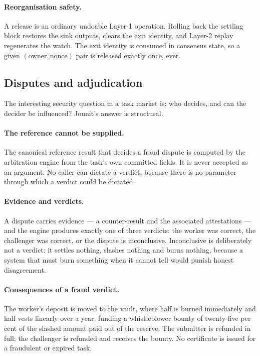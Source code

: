 \documentclass{article}
\begin{document}
\paragraph{Reorganisation safety.} A release is an ordinary undoable Layer-1
operation. Rolling back the settling block restores the sink outputs, clears
the exit identity, and Layer-2 replay regenerates the watch. The exit identity
is consumed in consensus state, so a given $(\text{owner}, \text{nonce})$ pair
is released exactly once, ever.

\subsection{Disputes and adjudication}
\label{sec:disputes}

The interesting security question in a task market is: who decides, and can the
decider be influenced? Jounit's answer is structural.

\paragraph{The reference cannot be supplied.} The canonical reference result
that decides a fraud dispute is computed by the arbitration engine from the
task's own committed fields. It is never accepted as an argument. No caller can
dictate a verdict, because there is no parameter through which a verdict could
be dictated.

\paragraph{Evidence and verdicts.} A dispute carries evidence --- a
counter-result and the associated attestations --- and the engine produces
exactly one of three verdicts: the worker was correct, the challenger was
correct, or the dispute is inconclusive. Inconclusive is deliberately not a
verdict: it settles nothing, slashes nothing and burns nothing, because a
system that must burn something when it cannot tell would punish honest
disagreement.

\paragraph{Consequences of a fraud verdict.} The worker's deposit is moved to
the vault, where half is burned immediately and half vests linearly over a
year, funding a whistleblower bounty of twenty-five per cent of the slashed
amount paid out of the reserve. The submitter is refunded in full; the
challenger is refunded and receives the bounty. No certificate is issued for a
fraudulent or expired task.
\end{document}
